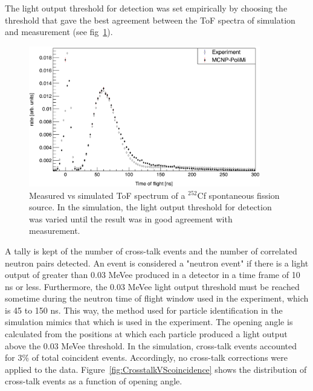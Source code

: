 The light output threshold for detection was set empirically by choosing the threshold that gave the best agreement between the ToF spectra of simulation and measurement (see fig~\ref{fig:Cf252MCNPVsEXP}).
\begin{figure}
    \centering
    \includegraphics[width = 0.9\textwidth]{Content/Errors/Cf252MCNPVsEXP.png}
    \caption{Measured vs simulated ToF spectrum of a $^{252}$Cf spontaneous fission source.
    In the simulation, the light output threshold for detection was varied until the result was in good agreement with measurement.}
    \label{fig:Cf252MCNPVsEXP}
\end{figure}
A tally is kept of the number of cross-talk events and the number of correlated neutron pairs detected.
An event is considered a "neutron event" if there is a light output of greater than 0.03 MeVee produced in a detector in a time frame of 10 ns or less.
Furthermore, the 0.03 MeVee light output threshold must be reached sometime during the neutron time of flight window used in the experiment, which is 45 to 150 ns.
This way, the method used for particle identification in the simulation mimics that which is used in the experiment.
The opening angle is calculated from the positions at which each particle produced a light output above the 0.03 MeVee threshold.
In the simulation, cross-talk events accounted for 3\% of total coincident events.
Accordingly, no cross-talk corrections were applied to the data.
Figure~\ref{fig:CrosstalkVScoincidence} shows the distribution of cross-talk events as a function of opening angle.
